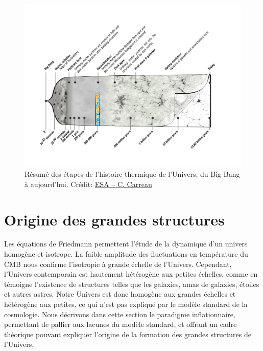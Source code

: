 \vfill %

\begin{figure}[t]
    \centering
    \includegraphics[width=.9\linewidth, trim={2cm 3cm 2cm 3cm}, clip]{Figures/Chap_cosmo/history_of_Universe.pdf}
    \caption{
        Résumé des étapes de l'histoire thermique de l'Univers, du Big Bang à aujourd'hui.
        Crédit: \href{https://www.esa.int/ESA_Multimedia/Images/2013/03/Planck_history_of_Universe_zoom}{ESA – C. Carreau}
    }
    \label{fig:cosmo:thermal_history}
\end{figure}

\section{Origine des grandes structures}\label{sec:struct_form}

Les équations de Friedmann permettent l'étude de la dynamique d'un univers homogène et isotrope.
La faible amplitude des fluctuations en température du CMB nous confirme l'isotropie à grande échelle de l'Univers.
Cependant, l'Univers contemporain est hautement hétérogène aux petites échelles, comme en témoigne l'existence de structures telles que les galaxies, amas de galaxies, étoiles et autres astres.
Notre Univers est donc homogène aux grandes échelles et hétérogène aux petites, ce qui n'est pas expliqué par le modèle standard de la cosmologie.
Nous décrivons dans cette section le paradigme inflationnaire, permettant de pallier aux lacunes du modèle standard, et offrant un cadre théorique pouvant expliquer l'origine de la formation des grandes structures de l'Univers.

